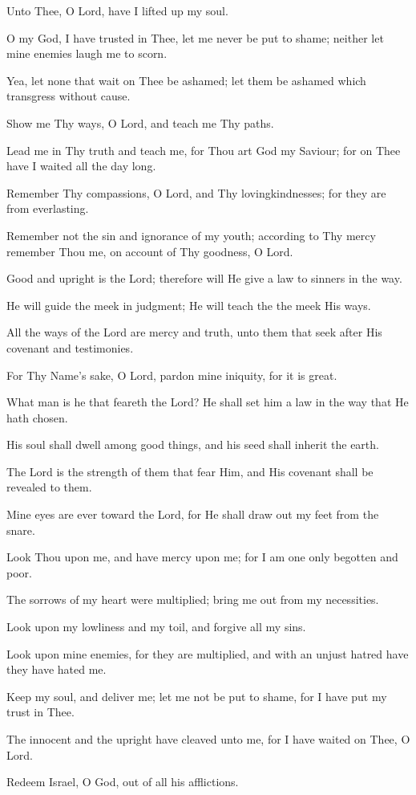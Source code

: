 Unto Thee, O Lord, have I lifted up my soul.

O my God, I have trusted in Thee, let me never be put to shame; neither let mine enemies laugh me to scorn.

Yea, let none that wait on Thee be ashamed; let them be ashamed which transgress without cause.

Show me Thy ways, O Lord, and teach me Thy paths.

Lead me in Thy truth and teach me, for Thou art God my Saviour; for on Thee have I waited all the day long.

Remember Thy compassions, O Lord, and Thy lovingkindnesses; for they are from everlasting.

Remember not the sin and ignorance of my youth; according to Thy mercy remember Thou me, on account of Thy goodness, O Lord.

Good and upright is the Lord; therefore will He give a law to sinners in the way.

He will guide the meek in judgment; He will teach the the meek His ways.

All the ways of the Lord are mercy and truth, unto them that seek after His covenant and testimonies.

For Thy Name's sake, O Lord, pardon mine iniquity, for it is great.

What man is he that feareth the Lord? He shall set him a law in the way that He hath chosen.

His soul shall dwell among good things, and his seed shall inherit the earth.

The Lord is the strength of them that fear Him, and His covenant shall be revealed to them.

Mine eyes are ever toward the Lord, for He shall draw out my feet from the snare.

Look Thou upon me, and have mercy upon me; for I am one only begotten and poor.

The sorrows of my heart were multiplied; bring me out from my necessities.

Look upon my lowliness and my toil, and forgive all my sins.

Look upon mine enemies, for they are multiplied, and with an unjust hatred have they have hated me.

Keep my soul, and deliver me; let me not be put to shame, for I have put my trust in Thee.

The innocent and the upright have cleaved unto me, for I have waited on Thee, O Lord.

Redeem Israel, O God, out of all his afflictions.
